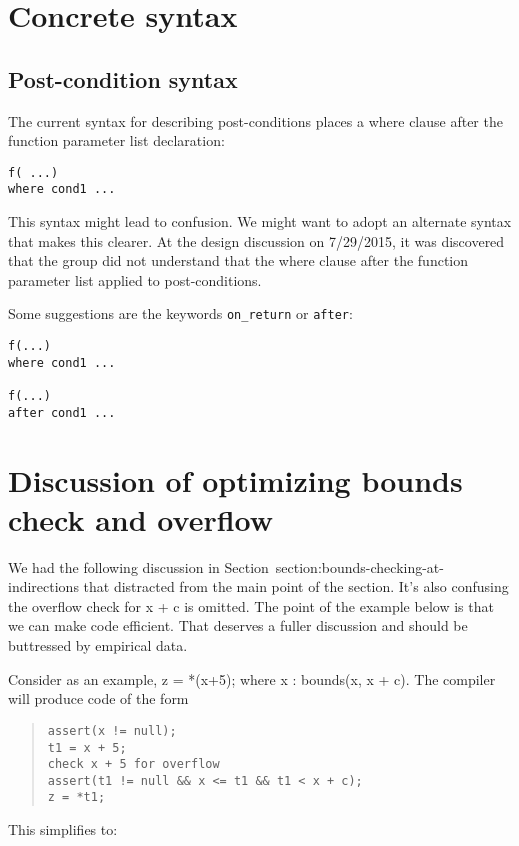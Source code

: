 \section{Concrete syntax}

\subsection{Post-condition syntax}
The current syntax for describing post-conditions places a where clause
after the function parameter list declaration:

\begin{verbatim}
f( ...)
where cond1 ...
\end{verbatim}

This syntax might lead to confusion. We might want to adopt an alternate
syntax that makes this clearer. At the design discussion on 7/29/2015,
it was discovered that the group did not understand that the where
clause after the function parameter list applied to post-conditions.

Some suggestions are the keywords \texttt{on\_return} or \texttt{after}:

\begin{verbatim}
f(...)
where cond1 ...

f(...)
after cond1 ...
\end{verbatim}

\section{Discussion of optimizing bounds check and overflow}

We had the following discussion in Section~{section:bounds-checking-at-indirections}
that distracted from the
main point of the section. It's also confusing the overflow check for x
+ c is omitted. The point of the example below is that we can make code
efficient. That deserves a fuller discussion and should be buttressed by
empirical data.

Consider as an example, z = *(x+5); where x : bounds(x, x + c). The
compiler will produce code of the form

\begin{quote}
\begin{verbatim}
assert(x != null);
t1 = x + 5;
check x + 5 for overflow
assert(t1 != null && x <= t1 && t1 < x + c);
z = *t1;
\end{verbatim}
\end{quote}

This simplifies to:

